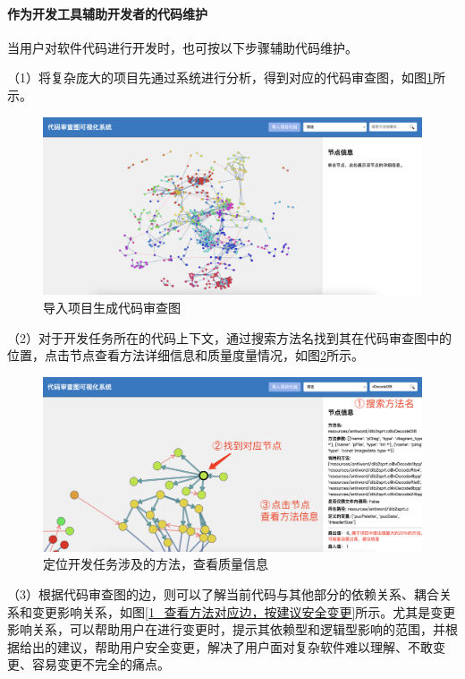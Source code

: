 \paragraph{作为开发工具辅助开发者的代码维护} 当用户对软件代码进行开发时，也可按以下步骤辅助代码维护。

\noindent（1）将复杂庞大的项目先通过系统进行分析，得到对应的代码审查图，如图\ref{1_导入项目生成代码审查图}所示。

\begin{figure}[h]
\centering
\includegraphics[width = 1.0\textwidth]{figures/开发1.jpg}
\caption{导入项目生成代码审查图}
\label{1_导入项目生成代码审查图}
\end{figure}

\noindent（2）对于开发任务所在的代码上下文，通过搜索方法名找到其在代码审查图中的位置，点击节点查看方法详细信息和质量度量情况，如图\ref{1_定位开发任务涉及的方法，查看质量信息}所示。

\begin{figure}[h]
\centering
\includegraphics[width = 1.0\textwidth]{figures/开发2.jpg}
\caption{定位开发任务涉及的方法，查看质量信息}
\label{1_定位开发任务涉及的方法，查看质量信息}
\end{figure}

\noindent（3）根据代码审查图的边，则可以了解当前代码与其他部分的依赖关系、耦合关系和变更影响关系，如图\ref{1_查看方法对应边，按建议安全变更}所示。尤其是变更影响关系，可以帮助用户在进行变更时，提示其依赖型和逻辑型影响的范围，并根据给出的建议，帮助用户安全变更，解决了用户面对复杂软件难以理解、不敢变更、容易变更不完全的痛点。

